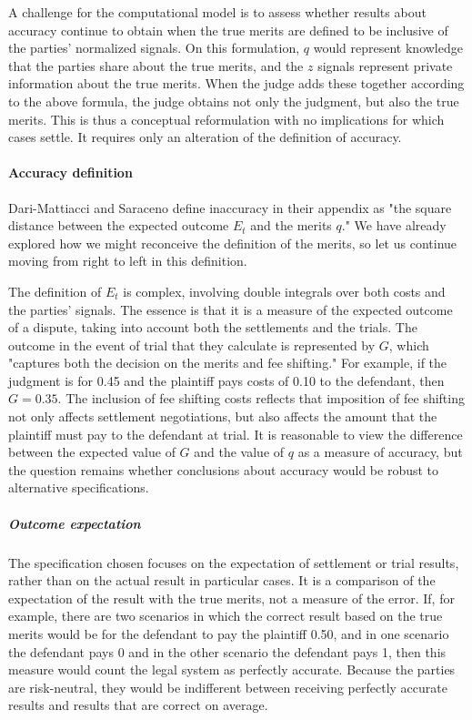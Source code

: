 \documentclass{article}
\begin{document}
A challenge for the computational model is to assess whether results about accuracy continue to obtain when the true merits are defined to be inclusive of the parties' normalized signals. On this formulation, $q$ would represent knowledge that the parties share about the true merits, and the $z$ signals represent private information about the true merits. When the judge adds these together according to the above formula, the judge obtains not only the judgment, but also the true merits. This is thus a conceptual reformulation with no implications for which cases settle. It requires only an alteration of the definition of accuracy.

\paragraph{Accuracy definition}Dari-Mattiacci and Saraceno define inaccuracy in their appendix as "the square distance between the expected outcome $E_t$ and the merits $q$." We have already explored how we might reconceive the definition of the merits, so let us continue moving from right to left in this definition. 

The definition of $E_t$ is complex, involving double integrals over both costs and the parties' signals. The essence is that it is a measure of the expected outcome of a dispute, taking into account both the settlements and the trials. The outcome in the event of trial that they calculate is represented by $G$, which "captures both the decision on the merits and fee shifting." For example, if the judgment is for 0.45 and the plaintiff pays costs of 0.10 to the defendant, then $G=0.35$. The inclusion of fee shifting costs reflects that imposition of fee shifting not only affects settlement negotiations, but also affects the amount that the plaintiff must pay to the defendant at trial. It is reasonable to view the difference between the expected value of $G$ and the value of $q$ as a measure of accuracy, but the question remains whether conclusions about accuracy would be robust to alternative specifications.

\subparagraph{Outcome expectation}The specification chosen focuses on the expectation of settlement or trial results, rather than on the actual result in particular cases. It is a comparison of the expectation of the result with the true merits, not a measure of the error. If, for example, there are two scenarios in which the correct result based on the true merits would be for the defendant to pay the plaintiff 0.50, and in one scenario the defendant pays 0 and in the other scenario the defendant pays 1, then this measure would count the legal system as perfectly accurate. Because the parties are risk-neutral, they would be indifferent between receiving perfectly accurate results and results that are correct on average. 
\end{document}
